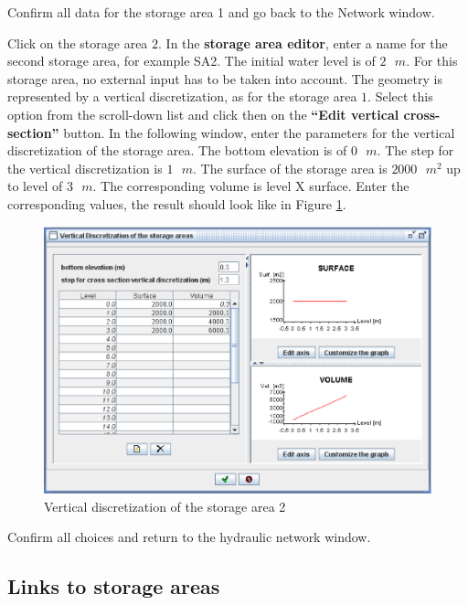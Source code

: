 \documentclass[a4paper,12pt]{article}
\begin{document}
Confirm all data for the storage area 1 and go back to the Network
window.

\vspace{0.5cm}

Click on the storage area $2$. In the \textbf{storage area editor},
enter a name for the second storage area, for example SA2. The initial
water level is of $2\mbox{ }m$. For this storage area, no external input has
to be taken into account. The geometry is represented by a vertical
discretization, as for the storage area $1$. Select this option from
the scroll-down list and click then on the \textbf{{}``Edit vertical
cross-section''} button. In the following window, enter the parameters
for the vertical discretization of the storage area. The bottom elevation
is of $0\mbox{ }m$. The step for the vertical discretization is $1\mbox{ }m$. The surface
of the storage area is $2000\mbox{ }m^2$ up to level of $3\mbox{ }m$.
The corresponding volume is level X surface. Enter the corresponding
values, the result should look like in Figure \ref{fig:Vertical-discretization-SA2}.

\newpage

\begin{figure}[h]
  \begin{center}
  \includegraphics[scale=0.5]{disc_SA2}
  \caption{Vertical discretization of the storage area 2}
  \label{fig:Vertical-discretization-SA2}
  \end{center}
\end{figure}


Confirm all choices and return to the hydraulic network window.


\subsection{Links to storage areas  }
\end{document}
